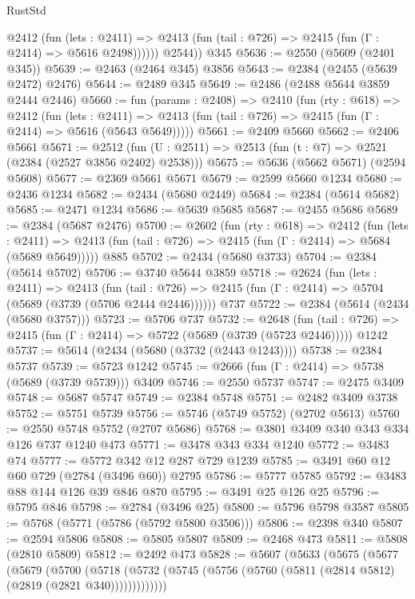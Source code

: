 \begin{lexlean}{RustStd}
\begin{coremodule}
            @2412
              (fun (lets : @2411) =>
              @2413 (fun (tail : @726) => @2415 (fun (Γ : @2414) => @5616 @2498))))))
        @2544))
    @345
@5636 := @2550 (@5609 (@2401 @345))
@5639 := @2463 (@2464 @345) @3856
@5643 := @2384 (@2455 (@5639 @2472) @2476)
@5644 := @2489 @345
@5649 := @2486 (@2488 @5644 @3859 @2444 @2446)
@5660 := fun (params : @2408) =>
  @2410
    (fun (rty : @618) =>
    @2412
      (fun (lets : @2411) =>
      @2413 (fun (tail : @726) => @2415 (fun (Γ : @2414) => @5616 (@5643 @5649)))))
@5661 := @2409 @5660
@5662 := @2406 @5661
@5671 := @2512 (fun (U : @2511) => @2513 (fun (t : @7) => @2521 (@2384 (@2527 @3856 @2402) @2538)))
@5675 := @5636 (@5662 @5671) (@2594 @5608)
@5677 := @2369 @5661 @5671
@5679 := @2599 @5660 @1234
@5680 := @2436 @1234
@5682 := @2434 (@5680 @2449)
@5684 := @2384 (@5614 @5682)
@5685 := @2471 @1234
@5686 := @5639 @5685
@5687 := @2455 @5686
@5689 := @2384 (@5687 @2476)
@5700 := @2602
    (fun (rty : @618) =>
    @2412
      (fun (lets : @2411) =>
      @2413 (fun (tail : @726) => @2415 (fun (Γ : @2414) => @5684 (@5689 @5649)))))
    @885
@5702 := @2434 (@5680 @3733)
@5704 := @2384 (@5614 @5702)
@5706 := @3740 @5644 @3859
@5718 := @2624
    (fun (lets : @2411) =>
    @2413
      (fun (tail : @726) => @2415 (fun (Γ : @2414) => @5704 (@5689 (@3739 (@5706 @2444 @2446))))))
    @737
@5722 := @2384 (@5614 (@2434 (@5680 @3757)))
@5723 := @5706 @737
@5732 := @2648
    (fun (tail : @726) => @2415 (fun (Γ : @2414) => @5722 (@5689 (@3739 (@5723 @2446)))))
    @1242
@5737 := @5614 (@2434 (@5680 (@3732 (@2443 @1243))))
@5738 := @2384 @5737
@5739 := @5723 @1242
@5745 := @2666 (fun (Γ : @2414) => @5738 (@5689 (@3739 @5739))) @3409
@5746 := @2550 @5737
@5747 := @2475 @3409
@5748 := @5687 @5747
@5749 := @2384 @5748
@5751 := @2482 @3409 @3738
@5752 := @5751 @5739
@5756 := @5746 (@5749 @5752) (@2702 @5613)
@5760 := @2550 @5748 @5752 (@2707 @5686)
@5768 := @3801 @3409 @340 @343 @334 @126 @737 @1240 @473
@5771 := @3478 @343 @334 @1240
@5772 := @3483 @74
@5777 := @5772 @342 @12 @287 @729 @1239
@5785 := @3491 @60 @12 @60 @729 (@2784 (@3496 @60)) @2795
@5786 := @5777 @5785
@5792 := @3483 @88 @144 @126 @39 @846 @870
@5795 := @3491 @25 @126 @25
@5796 := @5795 @846
@5798 := @2784 (@3496 @25)
@5800 := @5796 @5798 @3587
@5805 := @5768 (@5771 (@5786 (@5792 @5800 @3506)))
@5806 := @2398 @340
@5807 := @2594 @5806
@5808 := @5805 @5807
@5809 := @2468 @473
@5811 := @5808 (@2810 @5809)
@5812 := @2492 @473
@5828 := @5607
    (@5633
      (@5675
        (@5677
          (@5679
            (@5700
              (@5718
                (@5732 (@5745 (@5756 (@5760 (@5811 (@2814 @5812) (@2819 (@2821 @340)))))))))))))

\end{coremodule}
\end{lexlean}
